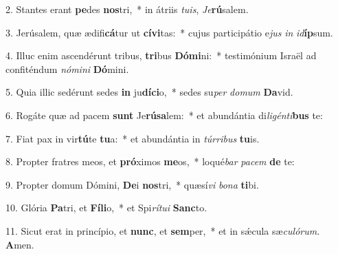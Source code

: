2. Stantes erant \textbf{pe}des \textbf{nos}tri,~*  in átriis \textit{tu}\textit{is}, \textit{Je}\textbf{rú}salem.\

3. Jerúsalem, quæ ædifi\textbf{cá}tur ut \textbf{cí}\textbf{vi}tas:~*  cujus participátio e\textit{jus} \textit{in} \textit{id}\textbf{íp}sum.\

4. Illuc enim ascendérunt tribus, \textbf{tri}bus \textbf{Dó}\textbf{mi}ni:~*  testimónium Israël ad confiténdum \textit{nó}\textit{mi}\textit{ni} \textbf{Dó}mini.\

5. Quia illic sedérunt sedes \textbf{in} ju\textbf{dí}\textbf{ci}o,~*  sedes su\textit{per} \textit{do}\textit{mum} \textbf{Da}vid.\

6. Rogáte quæ ad pacem \textbf{sunt} Je\textbf{rú}\textbf{sa}lem:~*  et abundántia di\textit{li}\textit{gén}\textit{ti}\textbf{bus} te:\

7. Fiat pax in vir\textbf{tú}te \textbf{tu}a:~*  et abundántia in \textit{túr}\textit{ri}\textit{bus} \textbf{tu}is.\

8. Propter fratres meos, et \textbf{pró}ximos \textbf{me}os,~*  loqué\textit{bar} \textit{pa}\textit{cem} \textbf{de} te:\

9. Propter domum Dómini, \textbf{De}i \textbf{nos}tri,~*  quæsí\textit{vi} \textit{bo}\textit{na} \textbf{ti}bi.\

10. Glória \textbf{Pa}tri, et \textbf{Fí}\textbf{li}o,~*  et Spi\textit{rí}\textit{tu}\textit{i} \textbf{Sanc}to.\

11. Sicut erat in princípio, et \textbf{nunc}, et \textbf{sem}per,~*  et in sǽcula sæ\textit{cu}\textit{ló}\textit{rum}. \textbf{A}men.\

